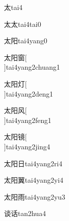 \begin{verbete}[4]{太}{tai4}
\end{verbete}

\begin{verbete}[4;4]{太太}{tai4tai0}
\end{verbete}

\begin{verbete}[4;6]{太阳}{tai4yang0}
\end{verbete}

\begin{verbete}[4;6;12]{太阳窗}[\\]{tai4yang2chuang1}
\end{verbete}

\begin{verbete}[4;6;6]{太阳灯}[\\]{tai4yang2deng1}
\end{verbete}

\begin{verbete}[4;6;4]{太阳风}[\\]{tai4yang2feng1}
\end{verbete}

\begin{verbete}[4;6;16]{太阳镜}[\\]{tai4yang2jing4}
\end{verbete}

\begin{verbete}[4;6;4]{太阳日}{tai4yang2ri4}
\end{verbete}

\begin{verbete}[4;6;17]{太阳翼}{tai4yang2yi4}
\end{verbete}

\begin{verbete}[4;6;8]{太阳雨}{tai4yang2yu3}
\end{verbete}

\begin{verbete}[10;8]{谈话}{tan2hua4}
\end{verbete}

